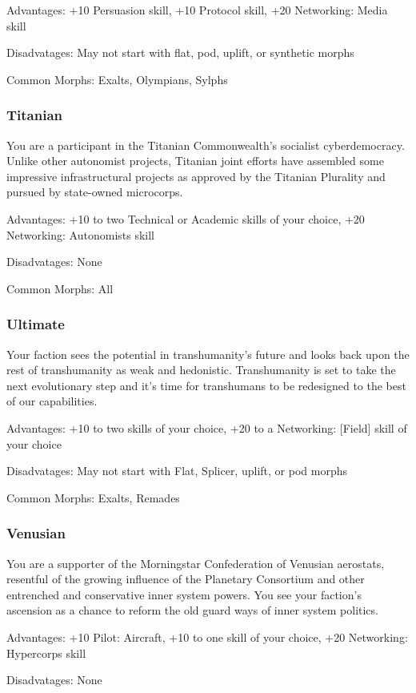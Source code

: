 Advantages: +10 Persuasion skill, +10 Protocol skill, +20 Networking: Media
skill

Disadvatages: May not start with flat, pod, uplift, or synthetic morphs

Common Morphs: Exalts, Olympians, Sylphs

\subsubsection{Titanian}
You are a participant in the Titanian Commonwealth’s socialist
cyberdemocracy. Unlike other autonomist projects, Titanian joint efforts have
assembled some impressive infrastructural projects as approved by the Titanian
Plurality and pursued by state-owned microcorps.

Advantages: +10 to two Technical or Academic skills of your choice, +20
Networking: Autonomists skill

Disadvatages: None

Common Morphs: All

\subsubsection{Ultimate}
Your faction sees the potential in transhumanity’s future and looks back upon
the rest of transhumanity as weak and hedonistic. Transhumanity is set to take
the next evolutionary step and it’s time for transhumans to be redesigned to
the best of our capabilities.

Advantages: +10 to two skills of your choice, +20 to a Networking: [Field]
skill of your choice

Disadvatages: May not start with Flat, Splicer, uplift, or pod morphs

Common Morphs: Exalts, Remades

\subsubsection{Venusian}
You are a supporter of the Morningstar Confederation of Venusian aerostats,
resentful of the growing influence of the Planetary Consortium and other
entrenched and conservative inner system powers. You see your faction’s
ascension as a chance to reform the old guard ways of inner system politics.

Advantages: +10 Pilot: Aircraft, +10 to one skill of your choice, +20
Networking: Hypercorps skill

Disadvatages: None

